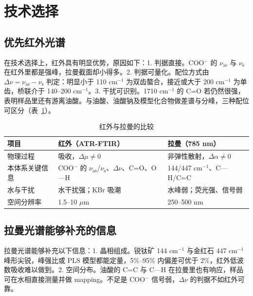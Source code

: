 \section{技术选择}

\subsection{优先红外光谱}

在技术选择上，红外具有明显优势，原因如下：1. 判据直接。COO$^-$ 的 $\nu_{\mathrm{as}}$ 与 $\nu_{\mathrm{s}}$ 在红外里都是强峰，拉曼截面却小得多。2. 判据可量化。配位方式由 $\Delta\nu=\nu_{\mathrm{as}}-\nu_{\mathrm{s}}$ 判定：明显小于 110 cm$^{-1}$ 为双齿螯合，接近或大于 200 cm$^{-1}$ 为单齿，桥联介于 140--200 cm$^{-1}$\cite{deacon1980}。3. 干扰可识别。1710 cm$^{-1}$ 的 C=O 若仍然很强，表明样品里还有游离油酸\cite{piao2026ir}。与油酸、油酸钠及模型化合物做差谱与分峰，三种配位可区分（表~\ref{tab:compare}）。

\begin{table}[H]
  \centering
  \caption{红外与拉曼的比较}
  \label{tab:compare}
  \small
  \begin{tabularx}{\textwidth}{@{}lXX@{}}
    \toprule
    项目 & 红外（ATR-FTIR） & 拉曼（785 nm） \\
    \midrule
    物理过程 & 吸收，$\Delta\mu\neq0$ & 非弹性散射，$\Delta\alpha\neq0$ \\
    本体系关键信息 & COO$^-$ 的 $\nu_{\mathrm{as}}$/$\nu_{\mathrm{s}}$、$\Delta\nu$、C=O、O—H & 144/447 cm$^{-1}$、C—H/C=C \\
    水与干扰 & 水干扰强；KBr 吸潮 & 水峰弱；荧光强、信号弱 \\
    空间分辨率 & 1.5--10 $\mu$m & 250--500 nm \\
    \bottomrule
  \end{tabularx}
\end{table}

\subsection{拉曼光谱能够补充的信息}

拉曼光谱能够补充以下信息：1. 晶相组成。锐钛矿 144 cm$^{-1}$ 与金红石 447 cm$^{-1}$ 峰形尖锐，峰强比或 PLS 模型都能定量，5\%--95\% 内偏差可优于 2\%\cite{sacco2023}，红外低波数吸收难以做到。2. 空间分布。油酸的 C=C 与 C—H 在拉曼里也有响应，样品可在水相直接测量并做 mapping\cite{kurouski2020}。不足是 COO$^-$ 信号弱，$\Delta\nu$ 的判据不如红外可靠。
